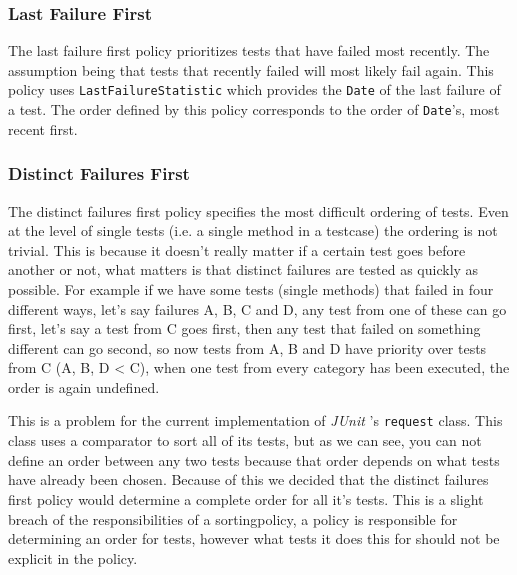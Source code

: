 \documentclass[i2]{oss}
\newcommand{\class}[1]{\texttt{#1}}
\newcommand{\junit}{\emph{JUnit }}
\begin{document}
\subsubsection{Last Failure First}

The last failure first policy prioritizes tests that have failed most 
recently.
The assumption being that tests that recently failed will most likely fail
again.
This policy uses \class{LastFailureStatistic} which provides the 
\class{Date} of the last failure of a test.
The order defined by this policy corresponds to the order of 
\class{Date}'s, most recent first.

\subsubsection{Distinct Failures First}

The distinct failures first policy specifies the most difficult 
ordering of tests.
Even at the level of single tests (i.e. a single method in a testcase)
the ordering is not trivial.
This is because it doesn't really matter if a certain test goes before 
another or not, what matters is that distinct failures are tested as 
quickly as possible.
For example if we have some tests (single methods) that failed in four
different ways, let's say failures A, B, C and D, any test from 
one of these can go first, let's say a test from C goes first, then 
any test that failed on something different can go second, so now 
tests from A, B and D have priority over tests from C (A, B, D < C), 
when one test from every category has been executed, the order is again 
undefined.

This is a problem for the current implementation of \junit's 
\class{request} class.
This class uses a comparator to sort all of its tests, but as we can 
see, you can not define an order between any two tests because that 
order depends on what tests have already been chosen.
Because of this we decided that the distinct failures first policy would
determine a complete order for all it's tests.
This is a slight breach of the responsibilities of a sortingpolicy,
a policy is responsible for determining an order for tests,
however what tests it does this for should not be explicit in the 
policy.
\end{document}
